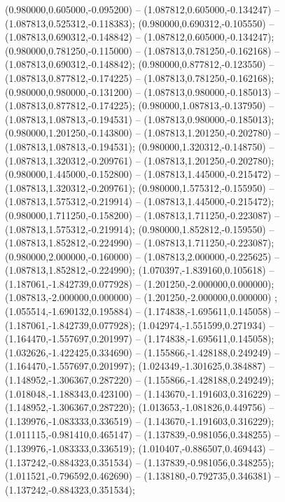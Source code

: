  (0.980000,0.605000,-0.095200) -- (1.087812,0.605000,-0.134247) -- (1.087813,0.525312,-0.118383);
 (0.980000,0.690312,-0.105550) -- (1.087813,0.690312,-0.148842) -- (1.087812,0.605000,-0.134247);
 (0.980000,0.781250,-0.115000) -- (1.087813,0.781250,-0.162168) -- (1.087813,0.690312,-0.148842);
 (0.980000,0.877812,-0.123550) -- (1.087813,0.877812,-0.174225) -- (1.087813,0.781250,-0.162168);
 (0.980000,0.980000,-0.131200) -- (1.087813,0.980000,-0.185013) -- (1.087813,0.877812,-0.174225);
 (0.980000,1.087813,-0.137950) -- (1.087813,1.087813,-0.194531) -- (1.087813,0.980000,-0.185013);
 (0.980000,1.201250,-0.143800) -- (1.087813,1.201250,-0.202780) -- (1.087813,1.087813,-0.194531);
 (0.980000,1.320312,-0.148750) -- (1.087813,1.320312,-0.209761) -- (1.087813,1.201250,-0.202780);
 (0.980000,1.445000,-0.152800) -- (1.087813,1.445000,-0.215472) -- (1.087813,1.320312,-0.209761);
 (0.980000,1.575312,-0.155950) -- (1.087813,1.575312,-0.219914) -- (1.087813,1.445000,-0.215472);
 (0.980000,1.711250,-0.158200) -- (1.087813,1.711250,-0.223087) -- (1.087813,1.575312,-0.219914);
 (0.980000,1.852812,-0.159550) -- (1.087813,1.852812,-0.224990) -- (1.087813,1.711250,-0.223087);
 (0.980000,2.000000,-0.160000) -- (1.087813,2.000000,-0.225625) -- (1.087813,1.852812,-0.224990);
 (1.070397,-1.839160,0.105618) -- (1.187061,-1.842739,0.077928) -- (1.201250,-2.000000,0.000000);
 (1.087813,-2.000000,0.000000) -- (1.201250,-2.000000,0.000000) ;
 (1.055514,-1.690132,0.195884) -- (1.174838,-1.695611,0.145058) -- (1.187061,-1.842739,0.077928);
 (1.042974,-1.551599,0.271934) -- (1.164470,-1.557697,0.201997) -- (1.174838,-1.695611,0.145058);
 (1.032626,-1.422425,0.334690) -- (1.155866,-1.428188,0.249249) -- (1.164470,-1.557697,0.201997);
 (1.024349,-1.301625,0.384887) -- (1.148952,-1.306367,0.287220) -- (1.155866,-1.428188,0.249249);
 (1.018048,-1.188343,0.423100) -- (1.143670,-1.191603,0.316229) -- (1.148952,-1.306367,0.287220);
 (1.013653,-1.081826,0.449756) -- (1.139976,-1.083333,0.336519) -- (1.143670,-1.191603,0.316229);
 (1.011115,-0.981410,0.465147) -- (1.137839,-0.981056,0.348255) -- (1.139976,-1.083333,0.336519);
 (1.010407,-0.886507,0.469443) -- (1.137242,-0.884323,0.351534) -- (1.137839,-0.981056,0.348255);
 (1.011521,-0.796592,0.462690) -- (1.138180,-0.792735,0.346381) -- (1.137242,-0.884323,0.351534);
